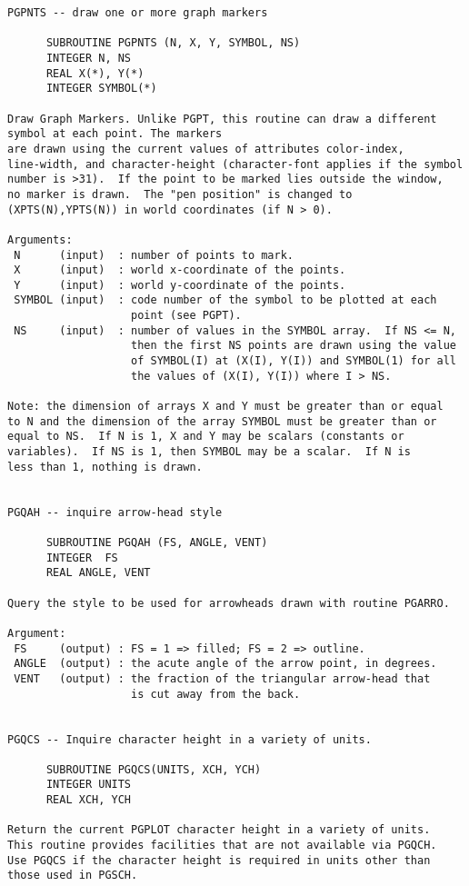 \begin{small}
\begin{verbatim}
PGPNTS -- draw one or more graph markers

      SUBROUTINE PGPNTS (N, X, Y, SYMBOL, NS)
      INTEGER N, NS
      REAL X(*), Y(*)
      INTEGER SYMBOL(*)
 
Draw Graph Markers. Unlike PGPT, this routine can draw a different
symbol at each point. The markers
are drawn using the current values of attributes color-index,
line-width, and character-height (character-font applies if the symbol
number is >31).  If the point to be marked lies outside the window,
no marker is drawn.  The "pen position" is changed to
(XPTS(N),YPTS(N)) in world coordinates (if N > 0).
 
Arguments:
 N      (input)  : number of points to mark.
 X      (input)  : world x-coordinate of the points.
 Y      (input)  : world y-coordinate of the points.
 SYMBOL (input)  : code number of the symbol to be plotted at each
                   point (see PGPT).
 NS     (input)  : number of values in the SYMBOL array.  If NS <= N,
                   then the first NS points are drawn using the value
                   of SYMBOL(I) at (X(I), Y(I)) and SYMBOL(1) for all
                   the values of (X(I), Y(I)) where I > NS.
 
Note: the dimension of arrays X and Y must be greater than or equal
to N and the dimension of the array SYMBOL must be greater than or
equal to NS.  If N is 1, X and Y may be scalars (constants or
variables).  If NS is 1, then SYMBOL may be a scalar.  If N is
less than 1, nothing is drawn.


PGQAH -- inquire arrow-head style

      SUBROUTINE PGQAH (FS, ANGLE, VENT)
      INTEGER  FS
      REAL ANGLE, VENT

Query the style to be used for arrowheads drawn with routine PGARRO.

Argument:
 FS     (output) : FS = 1 => filled; FS = 2 => outline.
 ANGLE  (output) : the acute angle of the arrow point, in degrees.
 VENT   (output) : the fraction of the triangular arrow-head that
                   is cut away from the back.


PGQCS -- Inquire character height in a variety of units.

      SUBROUTINE PGQCS(UNITS, XCH, YCH)
      INTEGER UNITS
      REAL XCH, YCH

Return the current PGPLOT character height in a variety of units.
This routine provides facilities that are not available via PGQCH.
Use PGQCS if the character height is required in units other than
those used in PGSCH.


\end{verbatim}
\end{small}
